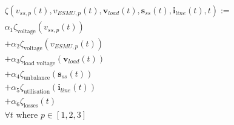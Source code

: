 

\begin{multline}
	\zeta(v_{ss,p}(t), v_{ESMU,p}(t), \textbf{v}_{load}(t), \textbf{s}_{ss}(t), \textbf{i}_{line}(t), t) :=\\
	\alpha_1 \zeta_\text{voltage}(v_{ss,p}(t))\\
	+ \alpha_2 \zeta_\text{voltage}(v_{ESMU,p}(t))\\
	+ \alpha_3 \zeta_\text{load voltage}(\textbf{v}_{load}(t))\\
	+ \alpha_4 \zeta_\text{unbalance}(\textbf{s}_{ss}(t))\\
	+ \alpha_5 \zeta_\text{utilisation}(\textbf{i}_{line}(t))\\
	+ \alpha_6 \zeta_\text{losses}(t)\\
	 \forall t \text{ where } p \in [1, 2, 3]
\label{ch1:equ:weighted-sum-cost-function}
\end{multline}